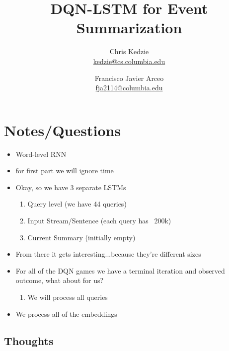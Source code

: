 \documentclass[12pt]{article}
\title{DQN-LSTM for Event Summarization}
\author{
	Chris Kedzie \\ \href{mailto: kedzie@cs.columbia.edu}{\small kedzie@cs.columbia.edu} 
		\and  
	Francisco Javier Arceo \\ \href{mailto: fja2114@columbia.edu}{\small fja2114@columbia.edu} 
	}
\begin{document}
\maketitle




\section{Notes/Questions}
\begin{itemize}
\item Word-level RNN
\item for first part we will ignore time
\item Okay, so we have 3 separate LSTMs
	\begin{enumerate}
		\item Query level  (we have 44 queries)
		\item Input Stream/Sentence (each query has ~200k)
		\item Current Summary (initially empty)
	\end{enumerate}
\item From there it gets interesting...because they're different sizes
\item For all of the DQN games we have a terminal iteration and observed outcome, what about for us?
	\begin{enumerate}
		\item We will process all queries
	\end{enumerate}
\item We process all of the embeddings
\end{itemize}

\subsection{Thoughts}
\end{document}
